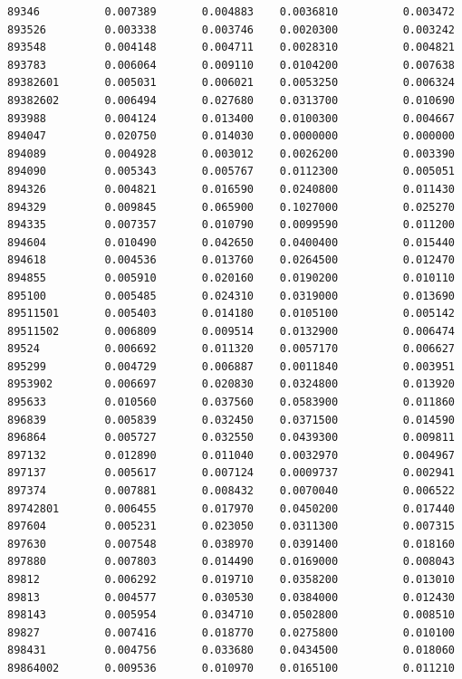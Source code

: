 \documentclass[
  letterpaper,
  DIV=11,
  numbers=noendperiod]{scrartcl}
\begin{document}
\begin{verbatim}
89346          0.007389       0.004883    0.0036810          0.003472
893526         0.003338       0.003746    0.0020300          0.003242
893548         0.004148       0.004711    0.0028310          0.004821
893783         0.006064       0.009110    0.0104200          0.007638
89382601       0.005031       0.006021    0.0053250          0.006324
89382602       0.006494       0.027680    0.0313700          0.010690
893988         0.004124       0.013400    0.0100300          0.004667
894047         0.020750       0.014030    0.0000000          0.000000
894089         0.004928       0.003012    0.0026200          0.003390
894090         0.005343       0.005767    0.0112300          0.005051
894326         0.004821       0.016590    0.0240800          0.011430
894329         0.009845       0.065900    0.1027000          0.025270
894335         0.007357       0.010790    0.0099590          0.011200
894604         0.010490       0.042650    0.0400400          0.015440
894618         0.004536       0.013760    0.0264500          0.012470
894855         0.005910       0.020160    0.0190200          0.010110
895100         0.005485       0.024310    0.0319000          0.013690
89511501       0.005403       0.014180    0.0105100          0.005142
89511502       0.006809       0.009514    0.0132900          0.006474
89524          0.006692       0.011320    0.0057170          0.006627
895299         0.004729       0.006887    0.0011840          0.003951
8953902        0.006697       0.020830    0.0324800          0.013920
895633         0.010560       0.037560    0.0583900          0.011860
896839         0.005839       0.032450    0.0371500          0.014590
896864         0.005727       0.032550    0.0439300          0.009811
897132         0.012890       0.011040    0.0032970          0.004967
897137         0.005617       0.007124    0.0009737          0.002941
897374         0.007881       0.008432    0.0070040          0.006522
89742801       0.006455       0.017970    0.0450200          0.017440
897604         0.005231       0.023050    0.0311300          0.007315
897630         0.007548       0.038970    0.0391400          0.018160
897880         0.007803       0.014490    0.0169000          0.008043
89812          0.006292       0.019710    0.0358200          0.013010
89813          0.004577       0.030530    0.0384000          0.012430
898143         0.005954       0.034710    0.0502800          0.008510
89827          0.007416       0.018770    0.0275800          0.010100
898431         0.004756       0.033680    0.0434500          0.018060
89864002       0.009536       0.010970    0.0165100          0.011210

\end{verbatim}
\end{document}

